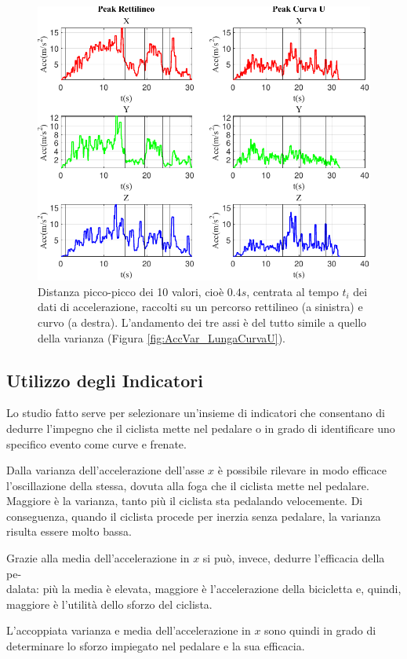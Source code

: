 \documentclass[class=article]{standalone}
\begin{document}
	\begin{center}
		\begin{figure}[h!]
			\centering\includegraphics[width=.7\textwidth]{img/LungaCurvaU/Acc/Peak}
			\caption[]{Distanza picco-picco dei 10 valori, cioè \(0.4s\), centrata al tempo \(t_{i}\) dei dati di accelerazione, raccolti su un percorso rettilineo (a sinistra) e curvo (a destra). L'andamento dei tre assi è del tutto simile a quello della varianza (Figura \ref{fig:AccVar_LungaCurvaU}).}
			\label{fig:AccPeak_LungaCurvaU}
		\end{figure}
	\end{center}
	
	\subsection{Utilizzo degli Indicatori}
	Lo studio fatto serve per selezionare un'insieme di indicatori che consentano di dedurre l'impegno che il ciclista mette nel pedalare o in grado di identificare uno specifico evento come curve e frenate.
	
	Dalla varianza dell'accelerazione dell'asse \(x\) è possibile rilevare in modo efficace l'oscillazione della stessa, dovuta alla foga che il ciclista mette nel pedalare. Maggiore è la varianza, tanto più il ciclista sta pedalando velocemente. Di conseguenza, quando il ciclista procede per inerzia senza pedalare, la varianza risulta essere molto bassa.
	
	Grazie alla media dell'accelerazione in \(x\) si può, invece, dedurre l'efficacia della pe-\\dalata: più la media è elevata, maggiore è l'accelerazione della bicicletta e, quindi, maggiore è l'utilità dello sforzo del ciclista.
	
	L'accoppiata varianza e media dell'accelerazione in \(x\) sono quindi in grado di determinare lo sforzo impiegato nel pedalare e la sua efficacia.
	
\end{document}
